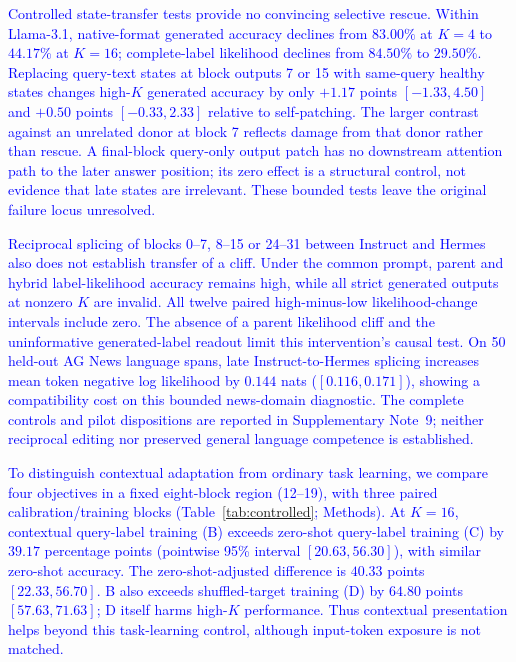 \documentclass[pdflatex, sn-nature]{sn-jnl}%
\theoremstyle{thmstyleone}%
\theoremstyle{thmstyletwo}%
\theoremstyle{thmstylethree}%
\begin{document}


\textcolor{blue}{Controlled state-transfer tests provide no convincing selective rescue. Within Llama-3.1, native-format generated accuracy declines from $83.00\%$ at $K{=}4$ to $44.17\%$ at $K{=}16$; complete-label likelihood declines from $84.50\%$ to $29.50\%$. Replacing query-text states at block outputs 7 or 15 with same-query healthy states changes high-$K$ generated accuracy by only $+1.17$ points $[-1.33,4.50]$ and $+0.50$ points $[-0.33,2.33]$ relative to self-patching. The larger contrast against an unrelated donor at block 7 reflects damage from that donor rather than rescue. A final-block query-only output patch has no downstream attention path to the later answer position; its zero effect is a structural control, not evidence that late states are irrelevant. These bounded tests leave the original failure locus unresolved.}

\textcolor{blue}{Reciprocal splicing of blocks 0--7, 8--15 or 24--31 between Instruct and Hermes also does not establish transfer of a cliff. Under the common prompt, parent and hybrid label-likelihood accuracy remains high, while all strict generated outputs at nonzero $K$ are invalid. All twelve paired high-minus-low likelihood-change intervals include zero. The absence of a parent likelihood cliff and the uninformative generated-label readout limit this intervention's causal test. On 50 held-out AG News language spans, late Instruct-to-Hermes splicing increases mean token negative log likelihood by $0.144$ nats ($[0.116,0.171]$), showing a compatibility cost on this bounded news-domain diagnostic. The complete controls and pilot dispositions are reported in Supplementary Note~9; neither reciprocal editing nor preserved general language competence is established.}

\textcolor{blue}{To distinguish contextual adaptation from ordinary task learning, we
compare four objectives in a fixed eight-block region (12--19), with three paired
calibration/training blocks (Table}~\textcolor{blue}{\ref{tab:controlled}}\textcolor{blue}{; Methods). At $K{=}16$,
contextual query-label training (B) exceeds zero-shot query-label training (C) by
$39.17$ percentage points (pointwise 95\%} \textcolor{blue}{interval $[20.63,56.30]$), with similar
zero-shot accuracy. The zero-shot-adjusted difference is $40.33$ points
$[22.33,56.70]$. B also exceeds shuffled-target training (D) by $64.80$ points
$[57.63,71.63]$; D itself harms high-$K$ performance. Thus contextual presentation
helps beyond this task-learning control, although input-token exposure is not matched.}
\end{document}
